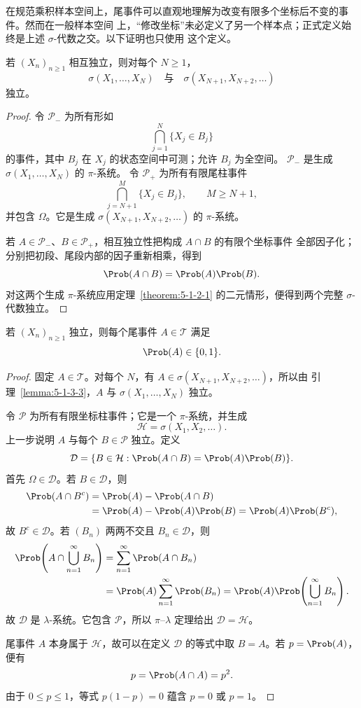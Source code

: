 在规范乘积样本空间上，尾事件可以直观地理解为改变有限多个坐标后不变的事件。然而在一般样本空间
上，“修改坐标”未必定义了另一个样本点；正式定义始终是上述 $\sigma$-代数之交。以下证明也只使用
这个定义。

\begin{lemma}[独立初段与尾段]\label{lemma:5-1-3-3}
若 $(X_n)_{n\ge1}$ 相互独立，则对每个 $N\ge1$，
\[
 \sigma(X_1,\ldots,X_N)
 \quad\text{与}\quad
 \sigma(X_{N+1},X_{N+2},\ldots)
\]
独立。
\end{lemma}

\begin{proof}
令 $\mathcal P_-$ 为所有形如
\[
 \bigcap_{j=1}^N\{X_j\in B_j\}
\]
的事件，其中 $B_j$ 在 $X_j$ 的状态空间中可测；允许 $B_j$ 为全空间。
$\mathcal P_-$ 是生成 $\sigma(X_1,\ldots,X_N)$ 的 $\pi$-系统。
令 $\mathcal P_+$ 为所有有限尾柱事件
\[
 \bigcap_{j=N+1}^{M}\{X_j\in B_j\},\qquad M\ge N+1,
\]
并包含 $\Omega$。它是生成 $\sigma(X_{N+1},X_{N+2},\ldots)$ 的 $\pi$-系统。

若 $A\in\mathcal P_-$、$B\in\mathcal P_+$，相互独立性把构成 $A\cap B$ 的有限个坐标事件
全部因子化；分别把初段、尾段内部的因子重新相乘，得到
\[
 \Prob(A\cap B)=\Prob(A)\Prob(B).
\]
对这两个生成 $\pi$-系统应用定理~\ref{theorem:5-1-2-1} 的二元情形，便得到两个完整
$\sigma$-代数独立。
\end{proof}

\begin{theorem}\label{theorem:5-1-3-3}
若 $(X_n)_{n\ge1}$ 独立，则每个尾事件 $A\in\mathcal T$ 满足
\[
 \Prob(A)\in\{0,1\}.
\]
\end{theorem}

\begin{proof}
固定 $A\in\mathcal T$。对每个 $N$，有
$A\in\sigma(X_{N+1},X_{N+2},\ldots)$，所以由
引理~\ref{lemma:5-1-3-3}，$A$ 与 $\sigma(X_1,\ldots,X_N)$ 独立。

令 $\mathcal P$ 为所有有限坐标柱事件；它是一个 $\pi$-系统，并生成
\[
 \mathcal H=\sigma(X_1,X_2,\ldots).
\]
上一步说明 $A$ 与每个 $B\in\mathcal P$ 独立。定义
\[
 \mathcal D=
 \{B\in\mathcal H:\Prob(A\cap B)=\Prob(A)\Prob(B)\}.
\]
首先 $\Omega\in\mathcal D$。若 $B\in\mathcal D$，则
\begin{align*}
 \Prob(A\cap B^c)
 &=\Prob(A)-\Prob(A\cap B)\\
 &=\Prob(A)-\Prob(A)\Prob(B)
 =\Prob(A)\Prob(B^c),
\end{align*}
故 $B^c\in\mathcal D$。若 $(B_n)$ 两两不交且 $B_n\in\mathcal D$，则
\begin{align*}
 \Prob\!\left(A\cap\bigcup_{n=1}^{\infty}B_n\right)
 &=\sum_{n=1}^{\infty}\Prob(A\cap B_n)\\
 &=\Prob(A)\sum_{n=1}^{\infty}\Prob(B_n)
 =\Prob(A)\Prob\!\left(\bigcup_{n=1}^{\infty}B_n\right).
\end{align*}
故 $\mathcal D$ 是 $\lambda$-系统。它包含 $\mathcal P$，所以 $\pi$--$\lambda$ 定理给出
$\mathcal D=\mathcal H$。

尾事件 $A$ 本身属于 $\mathcal H$，故可以在定义 $\mathcal D$ 的等式中取 $B=A$。若
$p=\Prob(A)$，便有
\[
 p=\Prob(A\cap A)=p^2.
\]
由于 $0\le p\le1$，等式 $p(1-p)=0$ 蕴含 $p=0$ 或 $p=1$。
\end{proof}

